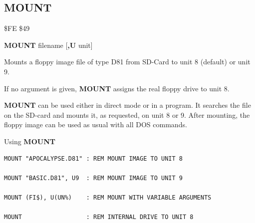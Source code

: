 \subsection{MOUNT}
\begin{description}[leftmargin=2cm,style=nextline]
\item [Token:]    \$FE \$49

\item [Format:]   {\bf MOUNT} filename [{\bf,U} unit]

\item [Usage:]    Mounts a floppy image file of type D81 from SD-Card to unit 8 (default) or unit 9.

                  If no argument is given, {\bf MOUNT} assigns the real floppy drive to unit 8.

                  \filenamedefinition

                  \unitdefinition

\item [Remarks:]  {\bf MOUNT} can be used either in direct mode or in a program. It searches the file on the SD-card and mounts it, as requested, on unit 8 or 9. After mounting, the floppy image can be used as usual with all DOS commands.

\item [Examples:] Using {\bf MOUNT}

\begin{tcolorbox}[colback=black,coltext=white]
\verbatimfont{\codefont}
\begin{verbatim}
MOUNT "APOCALYPSE.D81" : REM MOUNT IMAGE TO UNIT 8

MOUNT "BASIC.D81", U9  : REM MOUNT IMAGE TO UNIT 9

MOUNT (FI$), U(UN%)    : REM MOUNT WITH VARIABLE ARGUMENTS

MOUNT                  : REM INTERNAL DRIVE TO UNIT 8
\end{verbatim}
\end{tcolorbox}
\end{description}


\newpage

